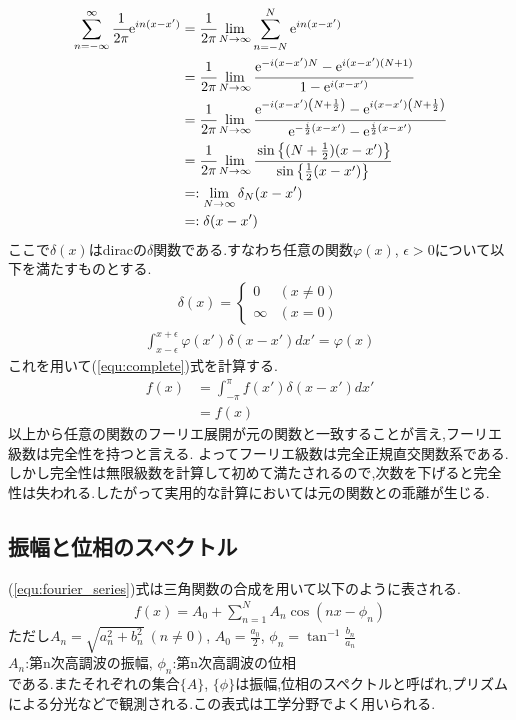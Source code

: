 \begin{align}
  \begin{split}
  \sum^{\infty}_{n=-\infty}\cfrac{1}{2\pi}\mathrm{e}^{in(x-x')}&=\cfrac{1}{2\pi}\lim_{N \to \infty}\sum_{n=-N}^N\mathrm{e}^{in(x-x')}\\
  &=\cfrac{1}{2\pi}\lim_{N\to\infty}\cfrac{\mathrm{e}^{-i(x-x')N}-\mathrm{e}^{i(x-x')(N+1)}}{1-\mathrm{e}^{i(x-x')}}\\
  &=\cfrac{1}{2\pi}\lim_{N\to\infty}\cfrac{\mathrm{e}^{-i(x-x')\left(N+\frac{1}{2}\right)}-\mathrm{e}^{i(x-x')\left(N+\frac{1}{2}\right)}}{\mathrm{e}^{-\frac{i}{2}(x-x')}-\mathrm{e}^{\frac{i}{2}(x-x')}}\\
  &=\cfrac{1}{2\pi}\lim_{N\to\infty}\cfrac{\sin\left\{(N+\frac{1}{2})(x-x')\right\}}{\sin\left\{\frac{1}{2}(x-x')\right\}}\\
  &=:\lim_{N\to\infty}\delta_N(x-x')\\
  &=:\delta(x-x')
  \end{split}
\end{align}
ここで$\delta(x)$はdiracの$\delta$関数である.すなわち任意の関数$\varphi(x)$, $\epsilon > 0$について以下を満たすものとする.
\begin{align*}
  \delta(x)=
  \begin{cases}
    0 & (x\neq0)\\
    \infty & (x=0)
  \end{cases}
\end{align*}
\begin{align*}
  \int^{x+\epsilon}_{x-\epsilon}\varphi(x')\delta(x-x')dx'=\varphi(x)
\end{align*}
これを用いて(\ref{equ:complete})式を計算する.
\begin{align}
    f(x)&=\int^{\pi}_{-\pi}f(x')\delta(x-x')dx'\\
    &=f(x)
\end{align}
以上から任意の関数のフーリエ展開が元の関数と一致することが言え,フーリエ級数は完全性を持つと言える.
よってフーリエ級数は完全正規直交関数系である.
しかし完全性は無限級数を計算して初めて満たされるので,次数を下げると完全性は失われる.したがって実用的な計算においては元の関数との乖離が生じる.
\subsection{振幅と位相のスペクトル}
(\ref{equ:fourier_series})式は三角関数の合成を用いて以下のように表される.
\begin{align}
  \label{equ:phase_fourier_series}
  f(x)=A_0+\sum^N_{n=1}A_n\cos(nx-\phi_n)
\end{align}
ただし$A_n=\sqrt{a_n^2+b_n^2}\ (n\neq0)$, $A_0=\tfrac{a_0}{2}$, $\phi_n=\tan^{-1}\tfrac{b_n}{a_n}$\\
$A_n$:第n次高調波の振幅, $\phi_n$:第n次高調波の位相\\である.またそれぞれの集合$\{A\}$, $\{\phi\}$は振幅,位相のスペクトルと呼ばれ,プリズムによる分光などで観測される.この表式は工学分野でよく用いられる.